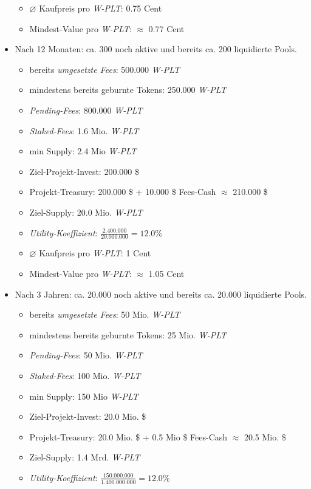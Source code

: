 \begin{Example}
\begin{itemize}
\begin{itemize}
		\item $\varnothing$ Kaufpreis pro \textit{W-PLT}: 0.75 Cent
		\item Mindest-Value pro \textit{W-PLT}: $\approx$ 0.77 Cent
	\end{itemize}
	\item Nach 12 Monaten: ca. 300 noch aktive und bereits ca. 200 liquidierte Pools.
	\begin{itemize}
		\item bereits \textit{umgesetzte Fees}: 500.000 \textit{W-PLT}  
		\item mindestens bereits geburnte Tokens: 250.000 \textit{W-PLT}
		\item \textit{Pending-Fees}: 800.000 \textit{W-PLT}  
		\item \textit{Staked-Fees}: 1.6 Mio. \textit{W-PLT} 
		\item min Supply: 2.4 Mio \textit{W-PLT} 
		\item Ziel-Projekt-Invest: 200.000 \$
		\item Projekt-Treasury: 200.000 \$ + 10.000 \$ Fees-Cash $\approx$ 210.000 \$
		\item Ziel-Supply: 20.0 Mio. \textit{W-PLT}
		\item \textit{Utility-Koeffizient}: $\frac{2.400.000}{20.000.000} = 12.0 \%$
		\item $\varnothing$ Kaufpreis pro \textit{W-PLT}: 1 Cent
		\item Mindest-Value pro \textit{W-PLT}: $\approx$ 1.05 Cent
	\end{itemize}
	\item Nach 3 Jahren: ca. 20.000 noch aktive und bereits ca. 20.000 liquidierte Pools.
	\begin{itemize}
		\item bereits \textit{umgesetzte Fees}: 50 Mio. \textit{W-PLT}  
		\item mindestens bereits geburnte Tokens: 25 Mio. \textit{W-PLT}
		\item \textit{Pending-Fees}: 50 Mio. \textit{W-PLT}  
		\item \textit{Staked-Fees}: 100 Mio. \textit{W-PLT} 
		\item min Supply: 150 Mio \textit{W-PLT} 
		\item Ziel-Projekt-Invest: 20.0 Mio. \$
		\item Projekt-Treasury: 20.0 Mio. \$ + 0.5 Mio \$ Fees-Cash $\approx$ 20.5 Mio. \$
		\item Ziel-Supply: 1.4 Mrd. \textit{W-PLT}
		\item \textit{Utility-Koeffizient}: $\frac{150.000.000}{1.400.000.000} = 12.0 \%$

\end{itemize}
\end{itemize}
\end{Example}
